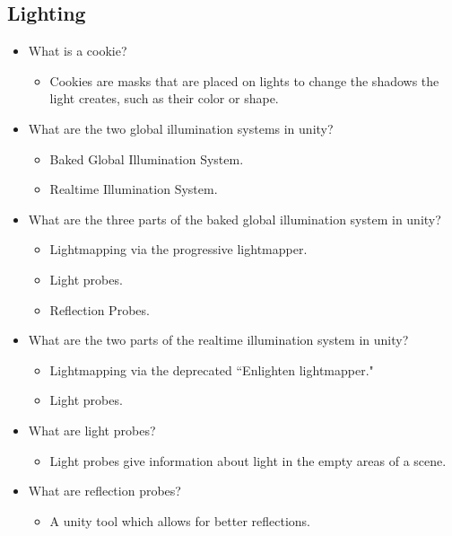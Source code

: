 \documentclass{article}
\begin{document}
\subsection{Lighting}
\begin{itemize}
    \item What is a cookie?
    \begin{itemize}
        \item Cookies are masks that are placed on lights to change the shadows the light creates, such as their color or shape.
    \end{itemize}
    \item What are the two global illumination systems in unity?
    \begin{itemize}
        \item Baked Global Illumination System.
        \item Realtime Illumination System.
    \end{itemize}
    \item What are the three parts of the baked global illumination system in unity?
    \begin{itemize}
        \item Lightmapping via the progressive lightmapper.
        \item Light probes.
        \item Reflection Probes.
    \end{itemize}
    \item What are the two parts of the realtime illumination system in unity?
    \begin{itemize}
        \item Lightmapping via the deprecated ``Enlighten lightmapper."
        \item Light probes.
    \end{itemize}
   
    \item What are light probes? 
    \begin{itemize}
        \item Light probes give information about light in the empty areas of a scene.
    \end{itemize}
    \item What are reflection probes?
    \begin{itemize}
        \item A unity tool which allows for better reflections.
    \end{itemize}
   

\end{itemize}
\end{document}
